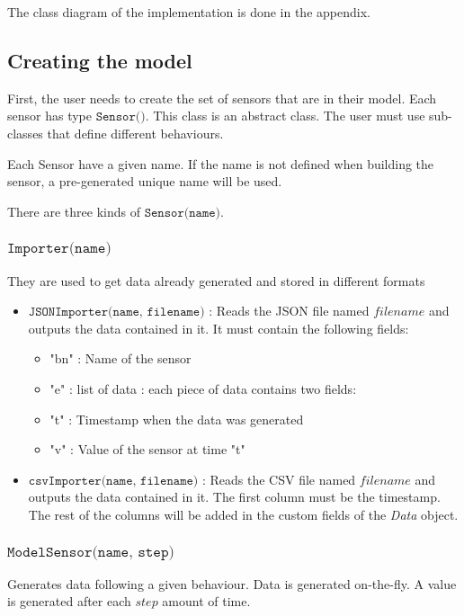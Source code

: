 
The class diagram of the implementation is done in the appendix.

\subsection{Creating the model}

First, the user needs to create the set of sensors that are in their model.
Each sensor has type $\texttt{Sensor()}$. This class is an abstract class.
The user must use sub-classes that define different behaviours.

Each Sensor have a given name. If the name is not defined when building the
sensor, a pre-generated unique name will be used.

There are three kinds of $\texttt{Sensor(name)}$.

\subsubsection{$\texttt{Importer(name)}$}
They are used to get data already generated and stored in different formats
\begin{itemize}
    \item $\texttt{JSONImporter(name, filename)}$ : Reads the JSON file named
        $filename$ and outputs the data contained in it. It must contain the
        following fields:
        \begin{itemize}
            \item "bn" : Name of the sensor
            \item "e" : list of data : each piece of data contains two fields:
            \item "t" : Timestamp when the data was generated
            \item "v" : Value of the sensor at time "t"
        \end{itemize}
    \item $\texttt{csvImporter(name, filename)}$ : Reads the CSV file named
        $filename$ and outputs the data contained in it. The first column must
        be the timestamp. The rest of the columns will be added in the custom
        fields of the \emph{Data} object.
\end{itemize}

\subsubsection{$\texttt{ModelSensor(name, step)}$}
Generates data following a given behaviour. Data is generated on-the-fly. A
value is generated after each $step$ amount of time.

